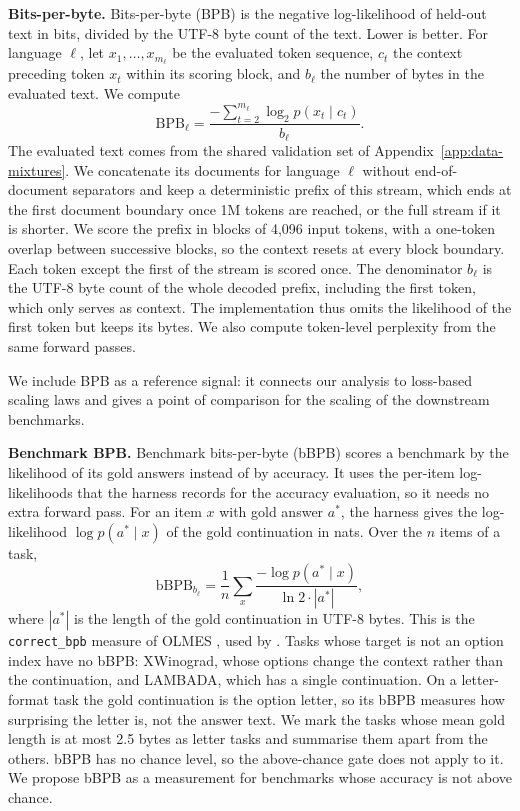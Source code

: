 \textbf{Bits-per-byte.} Bits-per-byte (BPB) is the negative log-likelihood of held-out text in bits, divided by the UTF-8 byte count of the text. Lower is better. For language $\ell$, let $x_1,\ldots,x_{m_\ell}$ be the evaluated token sequence, $c_t$ the context preceding token $x_t$ within its scoring block, and $b_\ell$ the number of bytes in the evaluated text. We compute
\begin{equation}
\mathrm{BPB}_\ell = \frac{-\sum_{t=2}^{m_\ell}\log_2 p(x_t \mid c_t)}{b_\ell}.
\label{eq:bpb}
\end{equation}
The evaluated text comes from the shared validation set of Appendix~\ref{app:data-mixtures}. We concatenate its documents for language $\ell$ without end-of-document separators and keep a deterministic prefix of this stream, which ends at the first document boundary once 1M tokens are reached, or the full stream if it is shorter. We score the prefix in blocks of 4,096 input tokens, with a one-token overlap between successive blocks, so the context resets at every block boundary. Each token except the first of the stream is scored once. The denominator $b_\ell$ is the UTF-8 byte count of the whole decoded prefix, including the first token, which only serves as context. The implementation thus omits the likelihood of the first token but keeps its bytes. We also compute token-level perplexity from the same forward passes.

We include BPB as a reference signal: it connects our analysis to loss-based scaling laws and gives a point of comparison for the scaling of the downstream benchmarks.

\textbf{Benchmark BPB.} Benchmark bits-per-byte (bBPB) scores a benchmark by the likelihood of its gold answers instead of by accuracy. It uses the per-item log-likelihoods that the harness records for the accuracy evaluation, so it needs no extra forward pass. For an item $x$ with gold answer $a^{*}$, the harness gives the log-likelihood $\log p(a^{*} \mid x)$ of the gold continuation in nats. Over the $n$ items of a task,
\[
\mathrm{bBPB}_{b_\ell} = \frac{1}{n} \sum_{x} \frac{-\log p(a^{*} \mid x)}{\ln 2 \cdot |a^{*}|},
\]
where $|a^{*}|$ is the length of the gold continuation in UTF-8 bytes. This is the \texttt{correct\_bpb} measure of OLMES \citeneeded{}, used by \citet{heineman_signal_2025}. Tasks whose target is not an option index have no bBPB: XWinograd, whose options change the context rather than the continuation, and LAMBADA, which has a single continuation. On a letter-format task the gold continuation is the option letter, so its bBPB measures how surprising the letter is, not the answer text. We mark the tasks whose mean gold length is at most 2.5 bytes as letter tasks and summarise them apart from the others. bBPB has no chance level, so the above-chance gate does not apply to it. We propose bBPB as a measurement for benchmarks whose accuracy is not above chance.
